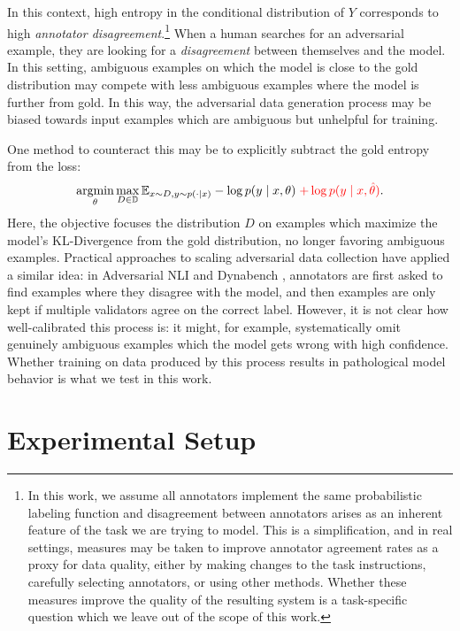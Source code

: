 \documentclass[10pt,a4paper]{article}
\begin{document}
In this context, high entropy in the conditional distribution of $Y$ corresponds to high \textit{annotator disagreement}.\footnote{In this work, we assume all annotators implement the same probabilistic labeling function and disagreement between annotators arises as an inherent feature of the task we are trying to model. This is a simplification, and in real settings, measures may be taken to improve annotator agreement rates as a proxy for data quality, either by making changes to the task instructions, carefully selecting annotators, or using other methods. Whether these measures improve the quality of the resulting system is a task-specific question which we leave out of the scope of this work.}
When a human searches for an adversarial example, they are looking for a \textit{disagreement} between themselves and the model. In this setting, ambiguous examples on which the model is close to the gold distribution may compete with less ambiguous examples where the model is further from gold.
In this way, the adversarial data generation process may be biased towards input examples which are ambiguous but unhelpful for training.

One method to counteract this may be to explicitly {\color{red}subtract the gold entropy} from the loss:
\begin{equation}
\operatorname*{argmin}_\theta \max_{D \in \mathbb{D}} \mathbb{E}_{x \sim D, y \sim p(\cdot \mid x)} -\log p(y \mid x, \theta) \; {\color{red} + \log p(y \mid x, \hat{\theta})}.
\label{eq:robust-opt-2}
\end{equation}
Here, the objective focuses the distribution $D$ on examples which maximize the model's KL-Divergence from the gold distribution, no longer favoring ambiguous examples. 
Practical approaches to scaling adversarial data collection have applied a similar idea: in Adversarial NLI \citep{nie-etal-2020-adversarial} and Dynabench \citep{kiela-etal-2021-dynabench}, annotators are first asked to find examples where they disagree with the model, and then examples are only kept if multiple validators agree on the correct label.
However, it is not clear how well-calibrated this process is: it might, for example, systematically omit genuinely ambiguous examples which the model gets wrong with high confidence.
Whether training on data produced by this process results in pathological model behavior is what we test in this work.

\section{Experimental Setup}
\label{sec:setup}
\end{document}
